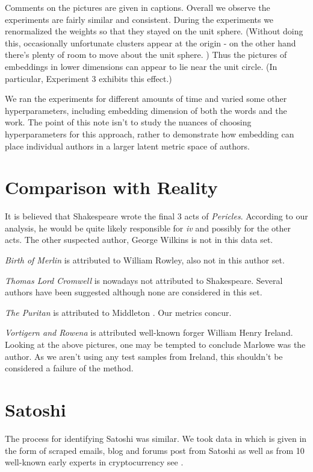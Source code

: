 \documentclass{article}%
\begin{document}
Comments on the pictures are given in captions.  Overall we observe the experiments are fairly similar and consistent.   During the experiments we renormalized the weights so that they stayed on the unit sphere.  (Without doing this, occasionally unfortunate clusters appear at the origin - on the other hand there's plenty of room to move about the unit sphere. )  Thus the pictures of embeddings in lower dimensions can appear to lie near the unit circle.  (In particular, Experiment 3 exhibits this effect.)  

We ran the experiments for different amounts of time and varied some other hyperparameters, including embedding dimension of both the words and the work. The point of this note isn't to study the nuances of choosing hyperparameters for this approach, rather to demonstrate how embedding can place individual authors in a larger latent metric space of authors. 


\section{Comparison with Reality}

It is believed \cite{M} that Shakespeare wrote the final 3 acts of \emph{Pericles}.   According to our analysis, he would be quite likely responsible for \emph{iv} and possibly for the other acts.   The other suspected author, George Wilkins is not in this data set.  

\emph{Birth of Merlin} is attributed to William Rowley, also not in this author set.  

\emph{Thomas Lord Cromwell} is nowadays not attributed to Shakespeare. Several authors have been suggested although none are considered in this set. 

\emph{The Puritan} is attributed to Middleton \cite{H}.  Our metrics concur.  


 \emph{Vortigern and Rowena} is attributed well-known forger William Henry Ireland.    Looking at the above pictures, one may be tempted to conclude Marlowe was the author.  As we aren't using any test samples from Ireland, this shouldn't be considered a failure of the method.  

\section{Satoshi}

The process for identifying Satoshi was similar.  We took data in \cite{RWgithub} which is given in the form of scraped emails, blog and forums post from Satoshi as well as from 10 well-known early experts in cryptocurrency see \cite[section 3.1.2]{RW}.  
\end{document}
